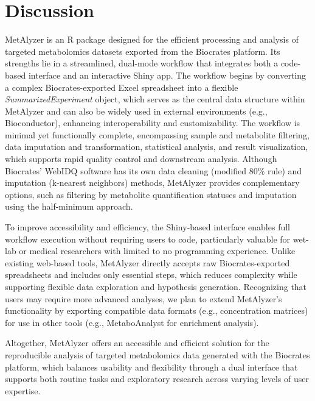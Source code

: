 \documentclass[12pt, a4paper]{article}
\begin{document}

\section*{\large Discussion}
MetAlyzer is an R package designed for the efficient processing and analysis of targeted metabolomics datasets exported from the Biocrates platform. Its strengths lie in a streamlined, dual-mode workflow that integrates both a code-based interface and an interactive Shiny app. The workflow begins by converting a complex Biocrates-exported Excel spreadsheet into a flexible \textit{SummarizedExperiment} object\cite{Morgan2022}, which serves as the central data structure within MetAlyzer and can also be widely used in external environments (e.g., Bioconductor\cite{Huber2015}), enhancing interoperability and customizability. The workflow is minimal yet functionally complete, encompassing sample and metabolite filtering, data imputation and transformation, statistical analysis, and result visualization, which supports rapid quality control and downstream analysis. Although Biocrates' WebIDQ software has its own data cleaning (modified 80\% rule\cite{Wei2018}) and imputation (k-nearest neighbors) methods, MetAlyzer provides complementary options, such as filtering by metabolite quantification statuses and imputation using the half-minimum approach.

To improve accessibility and efficiency, the Shiny-based interface enables full workflow execution without requiring users to code, particularly valuable for wet-lab or medical researchers with limited to no programming experience. Unlike existing web-based tools\cite{Pang2024,Galaxy2024,MWB}, MetAlyzer directly accepts raw Biocrates-exported spreadsheets and includes only essential steps, which reduces complexity while supporting flexible data exploration and hypothesis generation. Recognizing that users may require more advanced analyses, we plan to extend MetAlyzer's functionality by exporting compatible data formats (e.g., concentration matrices) for use in other tools (e.g., MetaboAnalyst for enrichment analysis\cite{Xia2010}).

Altogether, MetAlyzer offers an accessible and efficient solution for the reproducible analysis of targeted metabolomics data generated with the Biocrates platform, which balances usability and flexibility through a dual interface that supports both routine tasks and exploratory research across varying levels of user expertise.
\end{document}
